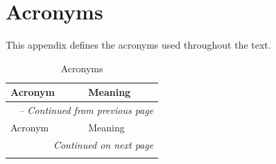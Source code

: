 \chapter{Acronyms}
\label{app_acronyms}
This appendix defines the acronyms used throughout the text.


\begin{longtable}{p{} p{}}
\caption{Acronyms} \label{tab:acronyms} \\

\toprule
Acronym & Meaning \\
\midrule
\endfirsthead

\multicolumn{2}{l}{\textit{\tablename\ \thetable{} -- Continued from previous page}} \\
\toprule
Acronym & Meaning \\
\midrule
\endhead

\multicolumn{2}{r}{\textit{Continued on next page}} \\
\bottomrule
\endfoot

\bottomrule
\endlastfoot



\end{longtable}

